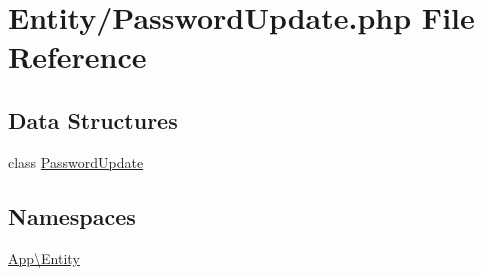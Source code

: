 \hypertarget{_password_update_8php}{}\section{Entity/\+Password\+Update.php File Reference}
\label{_password_update_8php}
\subsection*{Data Structures}
\begin{DoxyCompactItemize}
\item 
class \mbox{\hyperlink{class_app_1_1_entity_1_1_password_update}{Password\+Update}}
\end{DoxyCompactItemize}
\subsection*{Namespaces}
\begin{DoxyCompactItemize}
\item 
 \mbox{\hyperlink{namespace_app_1_1_entity}{App\textbackslash{}\+Entity}}
\end{DoxyCompactItemize}
